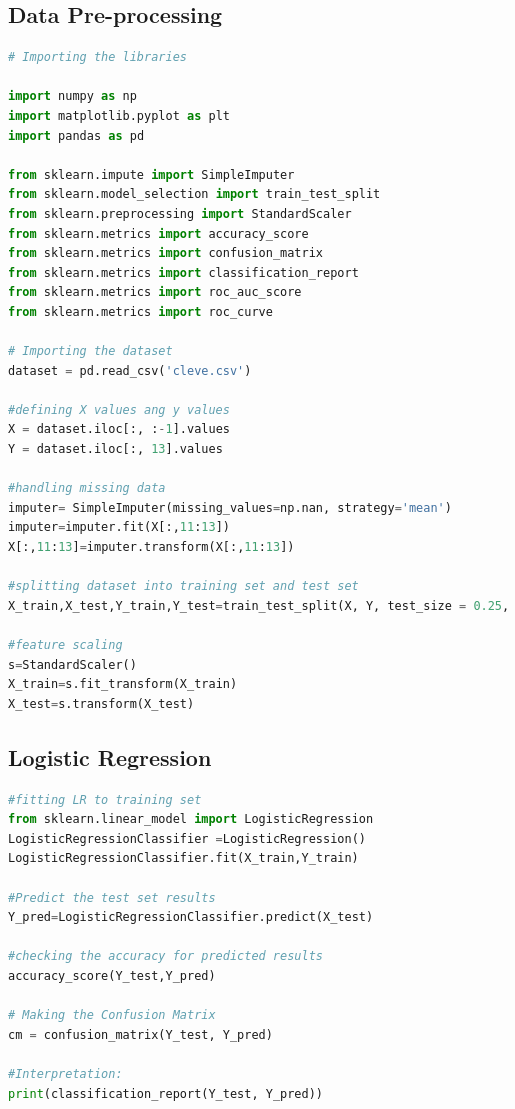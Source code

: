 \subsection{Data Pre-processing}
\begin{lstlisting}[language=Python, label=list:python_code_ex]
# Importing the libraries

import numpy as np
import matplotlib.pyplot as plt
import pandas as pd

from sklearn.impute import SimpleImputer
from sklearn.model_selection import train_test_split
from sklearn.preprocessing import StandardScaler
from sklearn.metrics import accuracy_score
from sklearn.metrics import confusion_matrix
from sklearn.metrics import classification_report
from sklearn.metrics import roc_auc_score
from sklearn.metrics import roc_curve

# Importing the dataset
dataset = pd.read_csv('cleve.csv')

#defining X values ang y values
X = dataset.iloc[:, :-1].values
Y = dataset.iloc[:, 13].values

#handling missing data
imputer= SimpleImputer(missing_values=np.nan, strategy='mean')
imputer=imputer.fit(X[:,11:13])
X[:,11:13]=imputer.transform(X[:,11:13])

#splitting dataset into training set and test set
X_train,X_test,Y_train,Y_test=train_test_split(X, Y, test_size = 0.25, random_state = 101)

#feature scaling
s=StandardScaler()
X_train=s.fit_transform(X_train)
X_test=s.transform(X_test)
\end{lstlisting}

\clearpage  %

\subsection{Logistic Regression}
\begin{lstlisting}[language=Python, label=list:python_code_ex]
#fitting LR to training set
from sklearn.linear_model import LogisticRegression
LogisticRegressionClassifier =LogisticRegression()
LogisticRegressionClassifier.fit(X_train,Y_train)

#Predict the test set results
Y_pred=LogisticRegressionClassifier.predict(X_test)

#checking the accuracy for predicted results
accuracy_score(Y_test,Y_pred)

# Making the Confusion Matrix
cm = confusion_matrix(Y_test, Y_pred)

#Interpretation:
print(classification_report(Y_test, Y_pred))
\end{lstlisting}

